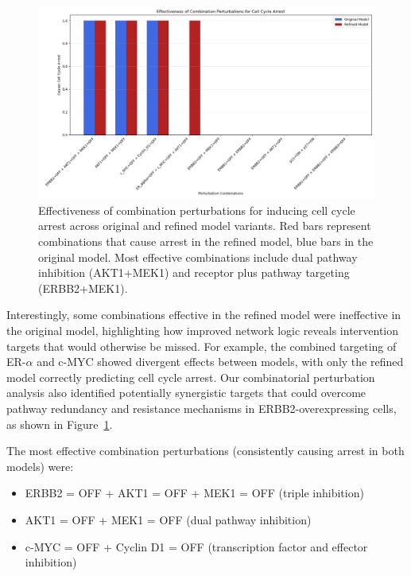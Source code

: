 \documentclass[a4paper,12pt]{article}
\begin{document}
\begin{figure}[!htb]
    \centering
    \includegraphics[width=\textwidth]{images/combination_perturbations.png}
    \caption{Effectiveness of combination perturbations for inducing cell cycle arrest across original and refined model variants. Red bars represent combinations that cause arrest in the refined model, blue bars in the original model. Most effective combinations include dual pathway inhibition (AKT1+MEK1) and receptor plus pathway targeting (ERBB2+MEK1).}
    \label{fig:combination_perturbations}
\end{figure}

Interestingly, some combinations effective in the refined model were ineffective in the original model, highlighting how improved network logic reveals intervention targets that would otherwise be missed. For example, the combined targeting of ER-$\alpha$ and c-MYC showed divergent effects between models, with only the refined model correctly predicting cell cycle arrest. Our combinatorial perturbation analysis also identified potentially synergistic targets that could overcome pathway redundancy and resistance mechanisms in ERBB2-overexpressing cells, as shown in Figure~\ref{fig:combination_perturbations}.

The most effective combination perturbations (consistently causing arrest in both models) were:
\begin{itemize}
    \item ERBB2 = OFF + AKT1 = OFF + MEK1 = OFF (triple inhibition)
    \item AKT1 = OFF + MEK1 = OFF (dual pathway inhibition)
    \item c-MYC = OFF + Cyclin D1 = OFF (transcription factor and effector inhibition)
\end{itemize}
\end{document}
